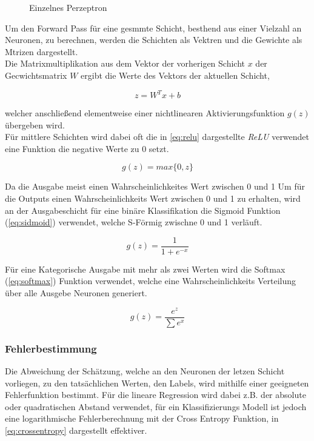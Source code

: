 \begin{figure}[h]
    \centering
    \label{fig:neuron}
    
    \caption{Einzelnes Perzeptron}
\end{figure}



Um den Forward Pass für eine gesmmte Schicht, besthend aus 
einer Vielzahl an Neuronen, zu berechnen, werden die Schichten 
als Vektren und die Gewichte als Mtrizen dargestellt.
\\
Die Matrixmultiplikation aus dem Vektor der vorherigen 
Schicht $x$ der Gecwichtsmatrix $W$ ergibt die Werte des Vektors 
der aktuellen Schicht,


\begin{equation}
    \label{eq:forward}
    z = W^{T}x+b
\end{equation}

welcher anschließend elementweise einer nichtlinearen Aktivierungsfunktion
$g(z)$ übergeben wird.\\
Für mittlere Schichten wird dabei oft die in \ref{eq:relu} dargestellte
\textit{ReLU} verwendet eine Funktion die negative Werte zu 0 setzt.

\begin{equation}
    \label{eq:relu}
    g(z) = max\{0,z\}
\end{equation}

Da die Ausgabe meist einen Wahrscheinlichkeites Wert zwischen 0 und 1 
Um für die Outputs einen Wahrscheinlichkeits Wert zwischen 0 und 1 
zu erhalten, wird an der Ausgabeschicht für eine binäre Klassifikation 
die Sigmoid Funktion (\ref{eq:sidmoid}) verwendet,
welche S-Förmig zwischne 0 und 1 verläuft.

\begin{equation}
    \label{eq:sidmoid}
    g(z) = \frac{1}{1 + e^{-x}}
\end{equation}


Für eine Kategorische Ausgabe mit mehr als zwei Werten wird 
die Softmax (\ref{eq:softmax}) Funktion verwendet, welche eine Wahrscheinlichkeits 
Verteilung über alle Ausgebe Neuronen generiert.

\begin{equation}
    \label{eq:softmax}
    g(z) = \frac{e^{z}}{\sum e^{x}}
\end{equation}


\subsubsection{Fehlerbestimmung}
Die Abweichung der Schätzung, welche an den Neuronen der letzen Schicht 
vorliegen, zu den tatsächlichen Werten, den Labels, wird mithilfe einer geeigneten
Fehlerfunktion bestimmt. Für die lineare Regression wird dabei z.B. 
der absolute oder quadratischen Abstand verwendet, für ein 
Klassifizierungs Modell ist jedoch eine logarithmische Fehlerberechnung 
mit der Cross Entropy Funktion, in \ref{eq:crossentropy} dargestellt effektiver.


